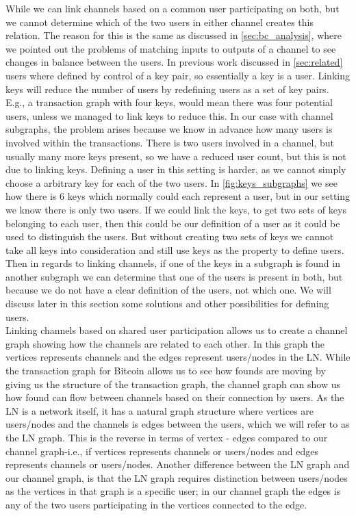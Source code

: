 While we can link channels based on a common user participating on both, but we cannot determine which of the two users in either channel creates this relation. 
The reason for this is the same as discussed in \cref{sec:bc_analysis}, where we pointed out the problems of matching inputs to outputs of a channel to see changes in balance between the users. 
In previous work discussed in \cref{sec:related} users where defined by control of a key pair, so essentially a key is a user.
Linking keys will reduce the number of users by redefining users as a set of key pairs.
E.g., a transaction graph with four keys, would mean there was four potential users, unless we managed to link keys to reduce this.
In our case with channel subgraphs, the problem arises because we know in advance how many users is involved within the transactions.
There is two users involved in a channel, but usually many more keys present, so we have a reduced user count, but this is not due to linking keys. Defining a user in this setting is harder, as we cannot simply choose a arbitrary key for each of the two users. In \cref{fig:keys_subgraphs} we see how there is 6 keys which normally could each represent a user, but in our setting we know there is only two users. If we could link the keys, to get two sets of keys belonging to each user, then this could be our definition of a user as it could be used to distinguish the users. But without creating two sets of keys we cannot take all keys into consideration and still use keys as the property to define users. Then in regards to linking channels, if one of the keys in a subgraph is found in another subgraph we can determine that one of the users is present in both, but because we do not have a clear definition of the users, not which one. We will discuss later in this section some solutions and other possibilities for defining users.
\\

Linking channels based on shared user participation allows us to create a channel graph showing how the channels are related to each other.
In this graph the vertices represents channels and the edges represent users/nodes in the LN.
While the transaction graph for Bitcoin allows us to see how founds are moving by giving us the structure of the transaction graph, 
the channel graph can show us how found can flow between channels based on their connection by users.
As the LN is a network itself, it has a natural graph structure where vertices are users/nodes and the channels is edges between the users, which we will refer to as the LN graph.
This is the reverse in terms of vertex - edges compared to our channel graph-i.e., if vertices represents channels or users/nodes and edges represents channels or users/nodes. Another difference between the LN graph and our channel graph, is that the LN graph requires distinction between users/nodes as the vertices in that graph is a specific user; in our channel graph the edges is any of the two users participating in the vertices connected to the edge.
\\

